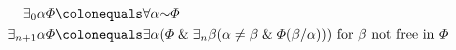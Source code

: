 \vspace{-.2in}
\begin{align*}
  \qt{\exists_0}{\alpha}\metaA &\colonequals \qt{\forall}{\alpha}\enot\metaA\\
  \qt{\exists_{n+1}}{\alpha}\metaA &\colonequals \qt{\exists}{\alpha}(\metaA \eand \qt{\exists_n}{\beta}(\alpha \neq \beta \eand \metaA(\beta/\alpha))) \text{ for } \beta \text{ not free in } \metaA
\end{align*}

